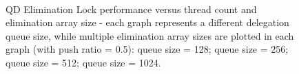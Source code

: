 \begin{figure}[]
\centering
{}
\\
\caption[]{QD Elimination Lock performance versus thread count and elimination array size - each graph represents a different delegation queue size, while multiple elimination array sizes are plotted in each graph (with push ratio = 0.5):  queue size = 128;  queue size = 256;  queue size = 512;  queue size = 1024.}
\label{fig:thrd_and_elsize}
\end{figure}

